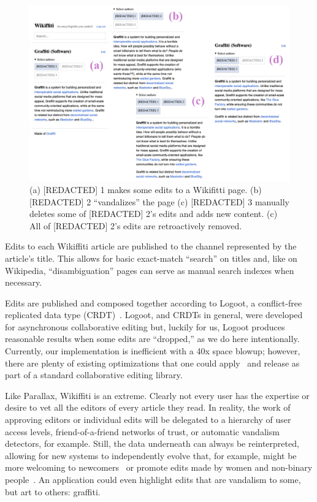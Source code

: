 \begin{figure}[htb]
    \centering
    \includegraphics[width=\textwidth]{paper/figures/wikiffiti.png}
    \caption{(a) [REDACTED] 1 makes some edits to a Wikifitti page. (b) [REDACTED] 2 ``vandalizes'' the page (c) [REDACTED] 3 manually deletes some of [REDACTED] 2's edits and adds new content. (c) All of [REDACTED] 2's edits are retroactively removed.
    }

    \label{case-studies:fig:wikiffiti}
\end{figure}

Edits to each Wikiffiti article are published to
the channel represented by the article's title.
This allows for basic exact-match ``search'' on titles and, like on Wikipedia,
``disambiguation'' pages can serve as manual search indexes when necessary.

Edits are published and composed together according to Logoot,
a conflict-free replicated data type (CRDT)~\cite{logoot,crdts}.
Logoot, and CRDTs in general, were developed for asynchronous collaborative editing
but, luckily for us, Logoot produces reasonable results when
some edits are ``dropped,'' as we do here intentionally.
Currently, our implementation is inefficient with a 40x space blowup;
however, there are plenty of existing optimizations that one could apply~\cite{logootbetter}
and release as part of a standard collaborative editing library.

Like Parallax, Wikiffiti is an extreme. Clearly not every user
has the expertise or desire to vet all the editors of
every article they read. In reality, the work of approving editors
or individual edits will be delegated to
a hierarchy of user access levels,
friend-of-a-friend networks of trust,
or automatic vandalism detectors, for example.
Still, the data underneath can always be reinterpreted, allowing
for new systems to independently evolve that,
for example, might be more welcoming to newcomers~\cite{wikibourgeoisie, wikirisedecline}
or promote edits made by women and non-binary people~\cite{wikigender}.
An application could even highlight edits that are vandalism to some,
but art to others: graffiti.



